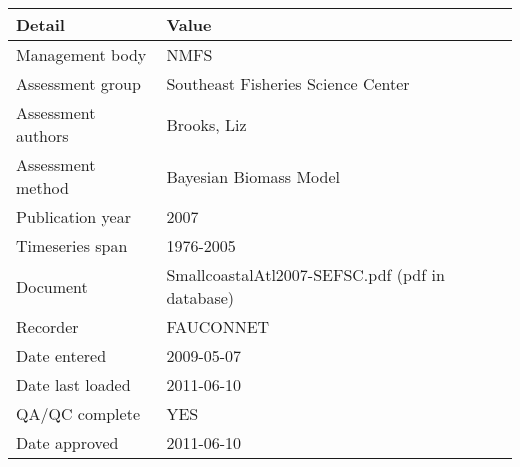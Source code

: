 \begin{table}[htb]
\centering
\begin{tabular}{lp{7cm}}
\toprule
Detail & Value \\
\midrule
Management body    & NMFS                                            \\
Assessment group   & Southeast Fisheries Science Center              \\
Assessment authors & Brooks, Liz                                     \\
Assessment method  & Bayesian Biomass Model                          \\
Publication year   & 2007                                            \\
Timeseries span    & 1976-2005                                       \\
Document           & SmallcoastalAtl2007-SEFSC.pdf (pdf in database) \\
Recorder           & FAUCONNET                                       \\
Date entered       & 2009-05-07                                      \\
Date last loaded   & 2011-06-10                                      \\
QA/QC complete     & YES                                             \\
Date approved      & 2011-06-10                                      \\
\bottomrule
\end{tabular}
\label{tab:assessdet}
\end{table}
